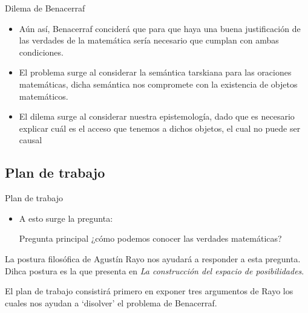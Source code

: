 \documentclass{beamer}
\begin{document}
        \begin{frame}{Dilema de Benacerraf}
            \begin{itemize}
                \item[] Aún así, Benacerraf conciderá que para que haya una 
                buena justificación de las verdades de la matemática 
                sería necesario que cumplan con ambas condiciones. \pause 

                \item[] El problema surge al considerar la semántica 
                tarskiana para las oraciones matemáticas, dicha semántica nos 
                compromete con la existencia de objetos matemáticos. \pause 

                \item[] El dilema surge al considerar nuestra epistemología, 
                dado que es necesario explicar cuál es el acceso 
                que tenemos a dichos objetos, el cual no puede ser causal
            \end{itemize}

        \end{frame}
    \subsection{Plan de trabajo}
        \begin{frame}{Plan de trabajo}
        \begin{itemize}
                \item [] A esto surge la pregunta:
            \begin{block}{Pregunta principal}
                ¿cómo podemos conocer las verdades 
                matemáticas? \pause 
            \end{block} 
        \end{itemize}
            La postura filosófica de Agustín Rayo nos ayudará 
                a responder a esta pregunta. Dihca 
                postura es la que presenta en \textit{La construcción 
                del espacio de posibilidades}. \pause   

            El plan de trabajo consistirá primero en 
            exponer tres argumentos de Rayo los cuales nos 
            ayudan a `disolver' el problema de Benacerraf.
        \end{frame}
\end{document}
